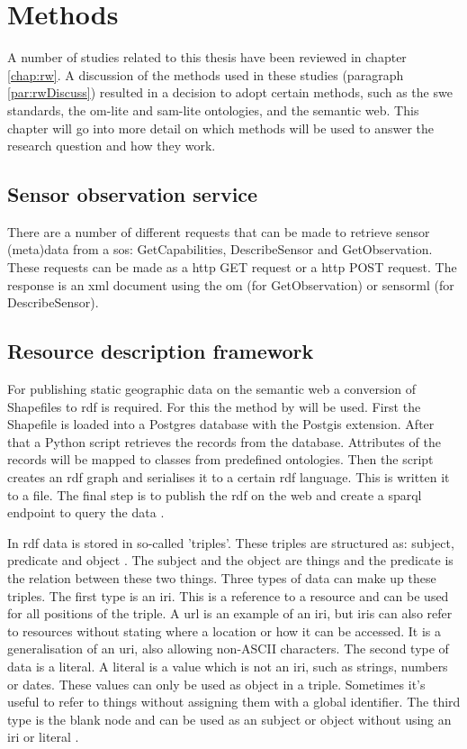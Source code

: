 

\section{Methods}
\label{chap:methods}

A number of studies related to this thesis have been reviewed in chapter \ref{chap:rw}. A discussion of the methods used in these studies (paragraph \ref{par:rwDiscuss}) resulted in a decision to adopt certain methods, such as the \ac{swe} standards, the om-lite and sam-lite ontologies, and the semantic web. This chapter will go into more detail on which methods will be used to answer the research question and how they work.  

\subsection{Sensor observation service}
There are a number of different requests that can be made to retrieve sensor (meta)data from a \ac{sos}: GetCapabilities, DescribeSensor and GetObservation. These requests can be made as a \ac{http} GET request or a \ac{http} POST request. The response is an \ac{xml} document using the \ac{om} (for GetObservation) or \ac{sensorml} (for DescribeSensor).

\subsection{Resource description framework}
For publishing static geographic data on the semantic web a conversion of Shapefiles to \ac{rdf} is required. For this the method by \cite{LD:Missier} will be used. First the Shapefile is loaded into a Postgres database with the Postgis extension. After that a Python script retrieves the records from the database. Attributes of the records will be mapped to classes from predefined ontologies. Then the script creates an \ac{rdf} graph and serialises it to a certain \ac{rdf} language. This is written it to a file. The final step is to publish the \ac{rdf} on the web and create a \ac{sparql} endpoint to query the data \citep{LD:Missier}. 

In \ac{rdf} data is stored in so-called 'triples'. These triples are structured as: subject, predicate and object \cite{LD:Berners-lee}. The subject and the object are things and the predicate is the relation between these two things. Three types of data can make up these triples. The first type is an \ac{iri}. This is a reference to a resource and can be used for all positions of the triple. A \ac{url} is an example of an \ac{iri}, but \ac{iri}s can also refer to resources without stating where a location or how it can be accessed. It is a generalisation of an \ac{uri}, also allowing non-ASCII characters. The second type of data is a literal. A literal is a value which is not an \ac{iri}, such as strings, numbers or dates. These values can only be used as object in a triple. Sometimes it's useful to refer to things without assigning them with a global identifier. The third type is the blank node and can be used as an subject or object without using an \ac{iri} or literal \citep{LD:W3C6}. 

